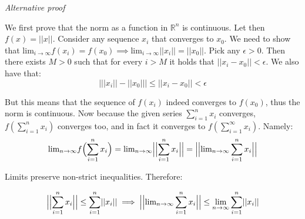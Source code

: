 \begin{solution}
    \textit{Alternative proof}

    We first prove that the norm as a function in $\mathbb{R}^n$ is continuous. Let then $f(x) = \lvert \lvert x \rvert \rvert$. Consider any sequence $x_i$ that converges to $x_0$. We need to show that $\text{lim}_{i \rightarrow \infty}f(x_i) = f(x_0) \implies \text{lim}_{i \rightarrow \infty} \lvert \lvert x_i \rvert \rvert = \lvert \lvert x_0 \rvert \rvert$. Pick any $\epsilon > 0$. Then there exists $M>0$ such that for every $i > M$ it holds that $\lvert \lvert x_i - x_0 \rvert \rvert < \epsilon$. We also have that:
    $$\bigl \lvert \lvert \lvert x_i \rvert \rvert - \lvert \lvert x_0 \rvert \rvert \bigr \rvert \leq \lvert \lvert x_i - x_0 \rvert \rvert < \epsilon$$

    But this means that the sequence of $f(x_i)$ indeed converges to $f(x_0)$, thus the norm is continuous. Now because the given series $\sum_{i=1}^{n}x_i$ converges, $f(\sum_{i=1}^{n}x_i)$ converges too, and in fact it converges to $f(\sum_{i=1}^{\infty}x_i)$. Namely:
    $$\text{lim}_{n \rightarrow \infty}f\Bigl(\sum_{i=1}^{n}x_i\Bigr) = \text{lim}_{n\rightarrow \infty} \Bigl\lvert \Bigl\lvert \sum_{i=1}^{n} x_i \Bigr\rvert \Bigr\rvert = \Bigl \lvert \Bigl \lvert \text{lim}_{n \rightarrow \infty} \sum_{i=1}^{n} x_i \Bigr \rvert \Bigr \rvert$$

    Limits preserve non-strict inequalities. Therefore:

    $$\Bigl \lvert \Bigl \lvert \sum_{i=1}^{n} x_i \Bigr \rvert \Bigr \rvert \leq \sum_{i=1}^{n} \lvert \lvert x_i \rvert \rvert \implies \Bigl \lvert \Bigl \lvert \text{lim}_{n \rightarrow \infty} \sum_{i=1}^{n} x_i \Bigr \rvert \Bigr \rvert \leq \lim_{n \rightarrow \infty} \sum_{i=1}^{n} \lvert \lvert x_i \rvert \rvert$$
   
\end{solution}

